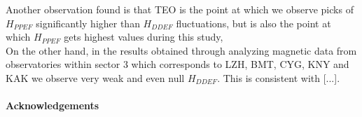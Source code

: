 \documentclass[a4paper]{article}
\theoremstyle{plain}
\theoremstyle{definition}
\begin{document}
	Another observation found is that TEO is the point at which we observe picks of $H_{PPEF}$ significantly higher than $H_{DDEF}$ fluctuations, but is also the point at which $H_{PPEF}$ gets highest values during this study,\\
	
	On the other hand, in the results obtained through analyzing magnetic data from observatories within sector 3 which corresponds to LZH, BMT, CYG, KNY and KAK we observe very weak and even null $H_{DDEF}$. This is consistent with [...].\\
	
	
	\paragraph{Acknowledgements} \lipsum[6]
	
	
	
	\appendix
	

	
\end{document}
